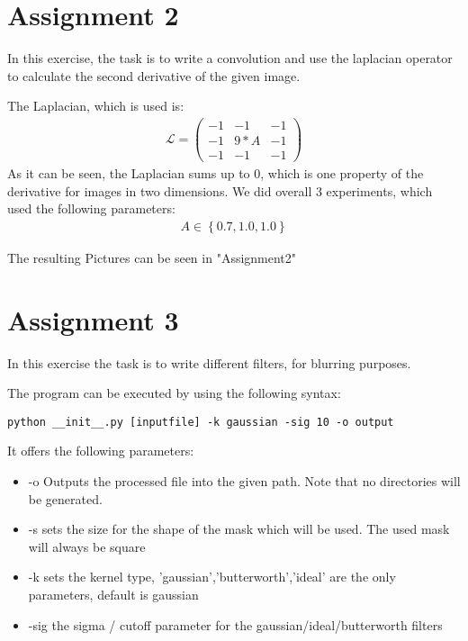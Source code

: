 \section{Assignment 2}

In this exercise, the task is to write a convolution and use the laplacian operator to calculate the second derivative of the given image.

The Laplacian, which is used is:
\begin{gather*}
\mathcal{L} = \left( \begin{array}{ccc}
-1 & -1 & -1\\
-1 & 9*A & -1\\
-1 & -1 & -1
\end{array} \right)
\end{gather*}
As it can be seen, the Laplacian sums up to 0, which is one property of the derivative for images in two dimensions.
We did overall 3 experiments, which used the following parameters:
\begin{gather*}
A \in \left\lbrace 0.7,1.0,1.0 \right\rbrace
\end{gather*}

The resulting Pictures can be seen in "Assignment2"


\section{Assignment 3}
In this exercise the task is to write different filters, for blurring purposes.

The program can be executed by using the following syntax:
\begin{verbatim}
python __init__.py [inputfile] -k gaussian -sig 10 -o output
\end{verbatim}
It offers the following parameters:

\begin{itemize}
\item -o Outputs the processed file into the given path. Note that no directories will be generated.
\item -s sets the size for the shape of the mask which will be used. The used mask will always be square
\item -k sets the kernel type, 'gaussian','butterworth','ideal' are the only parameters, default is gaussian
\item -sig the sigma / cutoff parameter for the gaussian/ideal/butterworth filters
\end{itemize}

